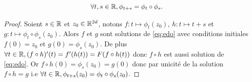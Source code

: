 \documentclass[10pt,a4paper]{article}
\begin{document}
\begin{Pte}\label{prop:compo}
  $$
  \forall t, s \in \mathbb{R}, \phi_{t+s} = \phi_t \circ \phi_s.
  $$
\end{Pte}
\begin{proof}
  Soient $s \in \mathbb{R}$ et $z_0 \in \mathbb{R}^{2d}$, notons $f : t \mapsto \phi_{t}(z_0)$, $h : t \mapsto t+s$ et $g : t \mapsto \phi_t \circ \phi_s (z_0)$. Alors $f$ et $g$ sont solutions de \eqref{eq:edo} avec conditions initiales $f(0) = z_0$ et $g(0) = \phi_s(z_0)$. De plus $\forall t \in \mathbb{R}, (f\circ h)'(t) = f'(h(t)) = F(f \circ h(t))$ donc $f \circ h$ est aussi solution de \eqref{eq:edo}. Or $f \circ h (0) = \phi_s(z_0) = g(0)$ donc par unicité de la solution $f \circ h = g$ i.e $\forall t \in \mathbb{R}, \phi_{t+s}(z_0) = \phi_t \circ \phi_s (z_0)$. 
\end{proof}
\end{document}
